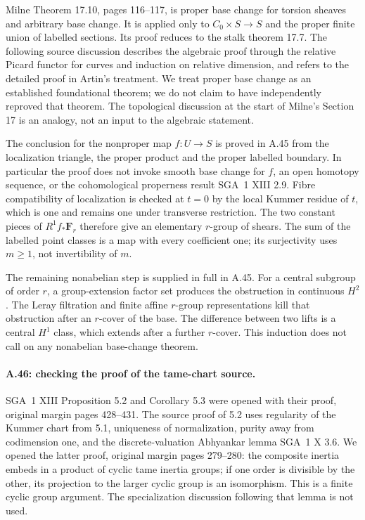Milne Theorem 17.10, pages 116--117, is proper base change for
torsion sheaves and arbitrary base change. It is applied only
to $C_0\times S\to S$ and the proper finite union of labelled
sections. Its proof reduces to the stalk theorem 17.7. The
following source discussion describes the algebraic proof through
the relative Picard functor for curves and induction on relative
dimension, and refers to the detailed proof in Artin's treatment.
We treat proper base change as an established foundational theorem;
we do not claim to have independently reproved that theorem.
The topological discussion at the start of Milne's Section 17 is
an analogy, not an input to the algebraic statement.

The conclusion for the nonproper map $f:U\to S$ is proved in
A.45 from the localization triangle, the proper product and the
proper labelled boundary. In particular the proof does not invoke
smooth base change for $f$, an open homotopy sequence, or the
cohomological properness result SGA~1 XIII 2.9. Fibre compatibility
of localization is checked at $t=0$ by the local Kummer residue
of $t$, which is one and remains one under transverse restriction.
The two constant pieces of $R^1f_*\mathbf F_r$ therefore give an
elementary $r$-group of shears. The sum of the labelled point
classes is a map with every coefficient one; its surjectivity
uses $m\ge1$, not invertibility of $m$.

The remaining nonabelian step is supplied in full in A.45.
For a central subgroup of order $r$, a group-extension factor set
produces the obstruction in continuous $H^2$. The Leray filtration
and finite affine $r$-group representations kill that obstruction
after an $r$-cover of the base. The difference between two lifts
is a central $H^1$ class, which extends after a further $r$-cover.
This induction does not call on any nonabelian base-change theorem.

\paragraph{A.46: checking the proof of the tame-chart source.}
SGA~1 XIII Proposition 5.2 and Corollary 5.3 were opened with
their proof, original margin pages 428--431. The source proof
of 5.2 uses regularity of the Kummer chart from 5.1, uniqueness
of normalization, purity away from codimension one, and the
discrete-valuation Abhyankar lemma SGA~1 X 3.6. We opened the
latter proof, original margin pages 279--280: the composite
inertia embeds in a product of cyclic tame inertia groups; if
one order is divisible by the other, its projection to the
larger cyclic group is an isomorphism. This is a finite cyclic
group argument. The specialization discussion following that
lemma is not used.


